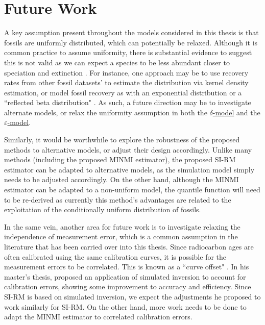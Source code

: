\section{Future Work}

A key assumption present throughout the models considered in this thesis is that fossils are uniformly distributed, which can potentially be relaxed. Although it is common practice to assume uniformity, there is substantial evidence to suggest this is not valid as we can expect a species to be less abundant closer to speciation and extinction \cite{Lee2010, WangMarshall2016}. For instance, one approach may be to use recovery rates from other fossil datasets' to estimate the distribution via kernel density estimation, or model fossil recovery as with an exponential distribution or a ``reflected beta distribution" \cite{Bradshaw2012, Wang2016}. As such, a future direction may be to investigate alternate models, or relax the uniformity assumption in both the \hyperref[model: no-measurement-error]{$\delta$-model} and the \hyperref[model: measurement-error]{$\varepsilon$-model}.

Similarly, it would be worthwhile to explore the robustness of the proposed methods to alternative models, or adjust their design accordingly. Unlike many methods (including the proposed MINMI estimator), the proposed SI-RM estimator can be adapted to alternative models, as the simulation model simply needs to be adjusted accordingly. On the other hand, although the MINMI estimator can be adapted to a non-uniform model, the quantile function will need to be re-derived as currently this method's advantages are related to the exploitation of the conditionally uniform distribution of fossils.

In the same vein, another area for future work is to investigate relaxing the independence of measurement error, which is a common assumption in the literature that has been carried over into this thesis. Since radiocarbon ages are often calibrated using the same calibration curves, it is possible for the measurement errors to be correlated. This is known as a ``curve offset" \cite{Ramsey2010}. In his master's thesis, \citet{King2020} proposed an application of simulated inversion to account for calibration errors, showing some improvement to accuracy and efficiency. Since SI-RM is based on simulated inversion, we expect the adjustments he proposed to work similarly for SI-RM. On the other hand, more work needs to be done to adapt the MINMI estimator to correlated calibration errors.

